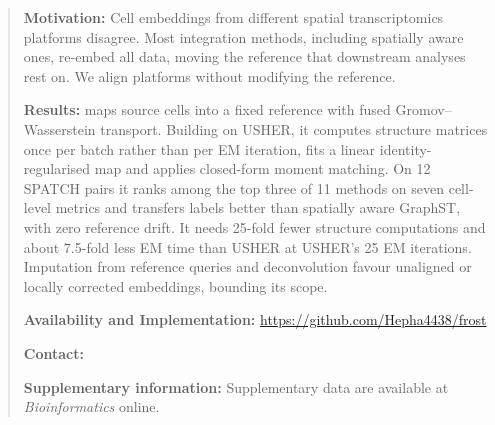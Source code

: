 \begin{abstract}
\noindent\textbf{Motivation:} Cell embeddings from different spatial transcriptomics platforms disagree. Most
integration methods, including spatially aware ones, re-embed all data, moving the reference that downstream analyses
rest on. We align platforms without modifying the reference.

\noindent\textbf{Results:} \frost maps source cells into a fixed reference with fused Gromov--Wasserstein transport.
Building on USHER, it computes structure matrices once per batch rather than per EM iteration, fits a linear
identity-regularised map and applies closed-form moment matching. On 12 SPATCH pairs it ranks among the top three of
11 methods on seven cell-level metrics and transfers labels better than spatially aware GraphST, with zero reference
drift. It needs 25-fold fewer structure computations and about 7.5-fold less EM time than USHER at USHER's 25 EM
iterations. Imputation from reference queries and deconvolution favour unaligned or locally corrected embeddings,
bounding its scope.

\noindent\textbf{Availability and Implementation:} \url{https://github.com/Hepha4438/frost}

\noindent\textbf{Contact:} 

\noindent\textbf{Supplementary information:} Supplementary data are available at \textit{Bioinformatics} online.
\end{abstract}
